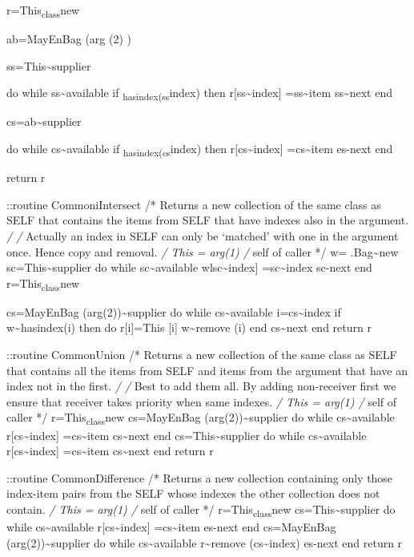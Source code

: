 r=This\textsubscript{class}new

ab=MayEnBag (arg (2) )

ss=This\textasciitilde supplier

do while ss\textasciitilde available if
\ab\textsubscript{hasindex(ss}index) then r{[}ss\textasciitilde index{]}
=ss\textasciitilde item ss\textasciitilde next end

cs=ab\textasciitilde supplier

do while cs\textasciitilde available if
\This\textsubscript{hasindex(cs}index) then
r{[}cs\textasciitilde index{]} =cs\textasciitilde item es-next end

return r

::routine CommoniIntersect /* Returns a new collection of the same class
as SELF that contains the items from SELF that have indexes also in the
argument. \emph{/ /} Actually an index in SELF can only be `matched'
with one in the argument once. Hence copy and removal. \emph{/ This =
arg(1) /} self of caller */ w= .Bag\textasciitilde new
sc=This\textasciitilde supplier do while sc\textasciitilde available
wlsc\textasciitilde index{]} =sc\textasciitilde index sc-next end
r=This\textsubscript{class}new

cs=MayEnBag (arg(2))\textasciitilde supplier do while
cs\textasciitilde available i=cs\textasciitilde index if
w\textasciitilde hasindex(i) then do r{[}i{]}=This {[}i{]}
w\textasciitilde remove (i) end cs\textasciitilde next end return r

::routine CommonUnion /* Returns a new collection of the same class as
SELF that contains all the items from SELF and items from the argument
that have an index not in the first. \emph{/ /} Best to add them all. By
adding non-receiver first we ensure that receiver takes priority when
same indexes. \emph{/ This = arg(1) /} self of caller */
r=This\textsubscript{class}new cs=MayEnBag
(arg(2))\textasciitilde supplier do while cs\textasciitilde available
r{[}cs\textasciitilde index{]} =cs\textasciitilde item
cs\textasciitilde next end cs=This\textasciitilde supplier do while
cs\textasciitilde available r{[}cs\textasciitilde index{]}
=cs\textasciitilde item cs\textasciitilde next end return r

::routine CommonDifference /* Returns a new collection containing only
those index-item pairs from the SELF whose indexes the other collection
does not contain. \emph{/ This = arg(1) /} self of caller */
r=This\textsubscript{class}new cs=This\textasciitilde supplier do while
cs\textasciitilde available r{[}cs\textasciitilde index{]}
=cs\textasciitilde item es-next end cs=MayEnBag
(arg(2))\textasciitilde supplier do while cs\textasciitilde available
r\textasciitilde remove (cs\textasciitilde index) es-next end return r

